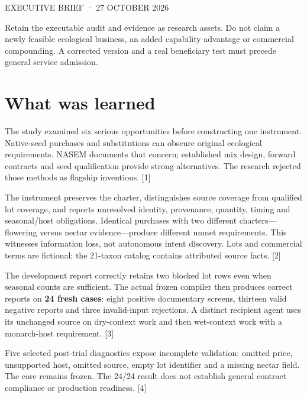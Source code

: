 \documentclass[10pt]{article}
\begin{document}
{\sffamily\bfseries\fontsize{19}{22}\selectfont\color{navy}\editiontitle\par}
\vspace{5pt}{\sffamily\fontsize{10.5}{13}\selectfont\raggedright\hyphenpenalty=10000\editionsubtitle\par}
\vspace{6pt}{\sffamily\bfseries\editionauthor\par}
{\sffamily\small\color{teal}EXECUTIVE BRIEF · 27 OCTOBER 2026}\par
\begin{finding}[title=Decision]
Retain the executable audit and evidence as research assets. Do not claim a newly feasible ecological business, an added capability advantage or commercial compounding. A corrected version and a real beneficiary test must precede general service admission.
\end{finding}

\section*{What was learned}
The study examined six serious opportunities before constructing one instrument. Native-seed purchases and substitutions can obscure original ecological requirements. NASEM documents that concern; established mix design, forward contracts and seed qualification provide strong alternatives. The research rejected those methods as flagship inventions. [1]

The instrument preserves the charter, distinguishes source coverage from qualified lot coverage, and reports unresolved identity, provenance, quantity, timing and seasonal/host obligations. Identical purchases with two different charters---flowering versus nectar evidence---produce different unmet requirements. This witnesses information loss, not autonomous intent discovery. Lots and commercial terms are fictional; the 21-taxon catalog contains attributed source facts. [2]

The development report correctly retains two blocked lot rows even when seasonal counts are sufficient. The actual frozen compiler then produces correct reports on \textbf{24 fresh cases}: eight positive documentary screens, thirteen valid negative reports and three invalid-input rejections. A distinct recipient agent uses its unchanged source on dry-context work and then wet-context work with a monarch-host requirement. [3]

\begin{boundary}[title=Finite success; broader defects]
Five selected post-trial diagnostics expose incomplete validation: omitted price, unsupported host, omitted source, empty lot identifier and a missing nectar field. The core remains frozen. The 24/24 result does not establish general contract compliance or production readiness. [4]
\end{boundary}
\end{document}
